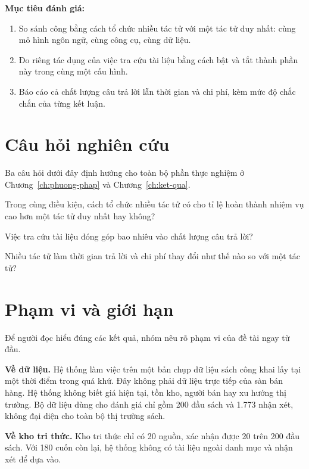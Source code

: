 \textbf{Mục tiêu đánh giá:}
\begin{enumerate}
    \item So sánh công bằng cách tổ chức nhiều tác tử với một tác tử duy nhất: cùng mô hình ngôn ngữ, cùng công cụ, cùng dữ liệu.
    \item Đo riêng tác dụng của việc tra cứu tài liệu bằng cách bật và tắt thành phần này trong cùng một cấu hình.
    \item Báo cáo cả chất lượng câu trả lời lẫn thời gian và chi phí, kèm mức độ chắc chắn của từng kết luận.
\end{enumerate}

\section{Câu hỏi nghiên cứu}

Ba câu hỏi dưới đây định hướng cho toàn bộ phần thực nghiệm ở Chương~\ref{ch:phuong-phap} và Chương~\ref{ch:ket-qua}.

\begin{description}[leftmargin=1.2cm,style=nextline]
    \item[Câu hỏi 1.] Trong cùng điều kiện, cách tổ chức nhiều tác tử có cho tỉ lệ hoàn thành nhiệm vụ cao hơn một tác tử duy nhất hay không?
    \item[Câu hỏi 2.] Việc tra cứu tài liệu đóng góp bao nhiêu vào chất lượng câu trả lời?
    \item[Câu hỏi 3.] Nhiều tác tử làm thời gian trả lời và chi phí thay đổi như thế nào so với một tác tử?
\end{description}

\section{Phạm vi và giới hạn}

Để người đọc hiểu đúng các kết quả, nhóm nêu rõ phạm vi của đề tài ngay từ đầu.

\textbf{Về dữ liệu.} Hệ thống làm việc trên một bản chụp dữ liệu sách công khai lấy tại một thời điểm trong quá khứ. Đây không phải dữ liệu trực tiếp của sàn bán hàng. Hệ thống không biết giá hiện tại, tồn kho, người bán hay xu hướng thị trường. Bộ dữ liệu dùng cho đánh giá chỉ gồm 200 đầu sách và 1.773 nhận xét, không đại diện cho toàn bộ thị trường sách.

\textbf{Về kho tri thức.} Kho tri thức chỉ có 20 nguồn, xác nhận được 20 trên 200 đầu sách. Với 180 cuốn còn lại, hệ thống không có tài liệu ngoài danh mục và nhận xét để dựa vào.

